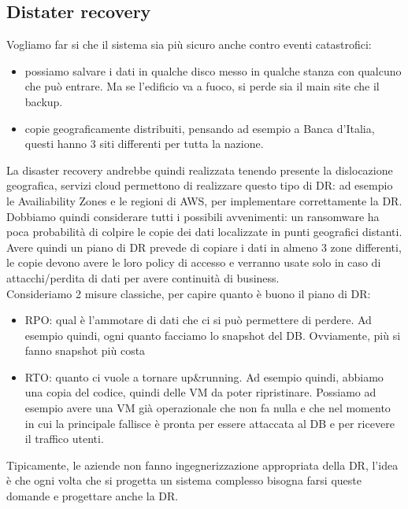 \documentclass[12pt, oneside]{extbook} %
\begin{document}
\subsection{Distater recovery}
Vogliamo far si che il sistema sia più sicuro anche contro eventi catastrofici:
\begin{itemize}
	\item possiamo salvare i dati in qualche disco messo in qualche stanza con qualcuno che può entrare. Ma se l'edificio va a fuoco, si perde sia il main site che il backup.
	\item copie geograficamente distribuiti, pensando ad esempio a Banca d'Italia, questi hanno 3 siti differenti per tutta la nazione.
\end{itemize}
La disaster recovery andrebbe quindi realizzata tenendo presente la dislocazione geografica, servizi cloud permettono di realizzare questo tipo di DR: ad esempio le Availiability Zones e le regioni di AWS, per implementare correttamente la DR.\\Dobbiamo quindi considerare tutti i possibili avvenimenti: un ransomware ha poca probabilità di colpire le copie dei dati localizzate in punti geografici distanti.\\Avere quindi un piano di DR prevede di copiare i dati in almeno 3 zone differenti, le copie devono avere le loro policy di accesso e verranno usate solo in caso di attacchi/perdita di dati per avere continuità di business.\\Consideriamo 2 misure classiche, per capire quanto è buono il piano di DR:
\begin{itemize}
	\item RPO: qual è l'ammotare di dati che ci si può permettere di perdere. Ad esempio quindi, ogni quanto facciamo lo snapshot del DB. Ovviamente, più si fanno snapshot più costa
	\item RTO: quanto ci vuole a tornare up\&running. Ad esempio quindi, abbiamo una copia del codice, quindi delle VM da poter ripristinare. Possiamo ad esempio avere una VM già operazionale che non fa nulla e che nel momento in cui la principale fallisce è pronta per essere attaccata al DB e per ricevere il traffico utenti.
\end{itemize}
Tipicamente, le aziende non fanno ingegnerizzazione appropriata della DR, l'idea è che ogni volta che si progetta un sistema complesso bisogna farsi queste domande e progettare anche la DR.
\end{document}
